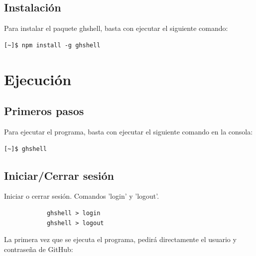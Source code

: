 \subsection{Instalación}
\label{subsec:b.1.3}

Para instalar el paquete ghshell, basta con ejecutar el siguiente comando:

\begin{verbatim}
[~]$ npm install -g ghshell
\end{verbatim}



\section{Ejecución}
\label{Apendice2:ejecucion}

\subsection{Primeros pasos}
\label{subsec:b.2.1}

Para ejecutar el programa, basta con ejecutar el siguiente comando en la consola:

\begin{verbatim}
[~]$ ghshell
\end{verbatim}


\subsection{Iniciar/Cerrar sesión}
\label{subsec:b.2.1}
    
    Iniciar o cerrar sesión. Comandos 'login' y 'logout'. 
    
    	\begin{verbatim}
			ghshell > login
			ghshell > logout
		\end{verbatim}
    
    La primera vez que se ejecuta el programa, pedirá directamente el usuario y contraseña de GitHub:
    
